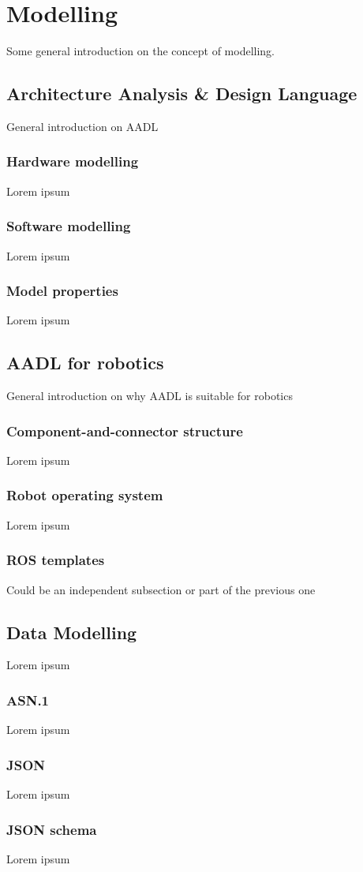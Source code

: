 \chapter{Modelling}\label{ch:Modelling}
Some general introduction on the concept of modelling.

\section{Architecture Analysis \& Design Language}
General introduction on AADL

\subsection{Hardware modelling}
Lorem ipsum

\subsection{Software modelling}
Lorem ipsum

\subsection{Model properties}
Lorem ipsum

\section{AADL for robotics}
General introduction on why AADL is suitable for robotics

\subsection{Component-and-connector structure}
Lorem ipsum

\subsection{Robot operating system}
Lorem ipsum

\subsection{ROS templates}
Could be an independent subsection or part of the previous one

\section{Data Modelling}
Lorem ipsum

\subsection{ASN.1}
Lorem ipsum

\subsection{JSON}
Lorem ipsum

\subsection{JSON schema}
Lorem ipsum

